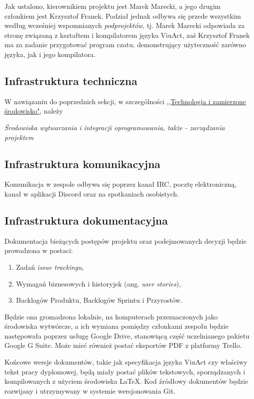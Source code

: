 \documentclass[11pt,oneside,a4paper,titlepage,onecolumn]{article}
\begin{document}
Jak ustalono, kierownikiem projektu jest Marek Marecki, a jego drugim członkiem jest Krzysztof Franek.
Podział jednak odbywa się przede wszystkim według wcześniej wspomnianych \textit{podprojektów}, tj. Marek
Marecki odpowiada za stronę związaną z kształtem i kompilatorem języka ViuAct, zaś Krzysztof Franek
ma za zadanie przygotować program czatu, demonstrujący użyteczność zarówno języka, jak i jego kompilatora.

\subsection{Infrastruktura techniczna}

W nawiązaniu do poprzednich sekcji, w szczególności \hyperref[sec:finalenvironment]{,,Technologia i zamierzone środowisko"}, należy 

\emph{Środowiska wytwarzania i integracji oprogramowania, także - zarządzania projektem}

\subsection{Infrastruktura komunikacyjna}

Komunikacja w zespole odbywa się poprzez kanał IRC, pocztę elektroniczną, kanał w aplikacji Discord oraz na spotkaniach osobistych.

\subsection{Infrastruktura dokumentacyjna}

Dokumentacja bieżących postępów projektu oraz podejmowanych decyzji będzie prowadzona w postaci:
\begin{enumerate}
	\item Zadań \textit{issue trackingu},
	\item Wymagań biznesowych i historyjek (ang. \textit{user stories}),
	\item Backlogów Produktu, Backlogów Sprintu i Przyrostów.
\end{enumerate}
Będzie ona gromadzona lokalnie, na komputerach przeznaczonych jako środowiska wytwórcze, a ich wymiana
pomiędzy członkami zespołu będzie następowała poprzez usługę Google Drive, stanowiącą część uczelnianego
pakietu Google G Suite. Może mieć również postać eksportów PDF z platformy Trello.

Końcowe wersje dokumentów, takie jak specyfikacja języka ViuAct czy właściwy tekst pracy dyplomowej,
będą miały postać plików tekstowych, sporządzanych i kompilowanych z użyciem środowiska LaTeX.
Kod źródłowy dokumentów będzie rozwijany i utrzymywany w systemie wersjonowania Git.
\end{document}
